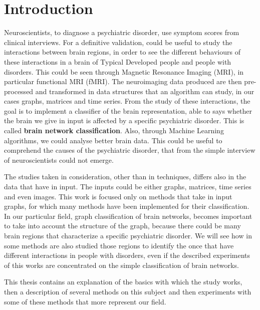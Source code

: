 \chapter{Introduction}
\label{chap:1}

Neuroscientists, to diagnose a psychiatric disorder, use symptom scores from clinical interviews. For a definitive validation, could be useful to study the interactions between brain regions, in order to see the different behaviours of these interactions in a brain of Typical Developed people and people with disorders. This could be seen through Magnetic Resonance Imaging (MRI), in particular functional MRI (fMRI). The neuroimaging data produced are then pre-processed and transformed in data structures that an algorithm can study, in our cases graphs, matrices and time series. From the study of these interactions, the goal is to implement a classifier of the brain representation, able to says whether the brain we give in input is affected by a specific psychiatric disorder. This is called \textbf{brain network classification}. Also, through Machine Learning algorithms, we could analyse better brain data. This could be useful to comprehend the causes of the psychiatric disorder, that from the simple interview of neuroscientists could not emerge. 
\vspace{0.5cm}

The studies taken in consideration, other than in techniques, differs also in the data that have in input. The inputs could be either graphs, matrices, time series and even images. This work is focused only on methods that take in input graphs, for which many methods have been implemented for their classification. In our particular field, graph classification of brain networks, becomes important to take into account the structure of the graph, because there could be many brain regions that characterize a specific psychiatric disorder. We will see how in some methods are also studied those regions to identify the once that have different interactions in people with disorders, even if the described experiments of this works are concentrated on the simple classification of brain networks. 
\vspace{0.5cm}

This thesis contains an explanation of the basics with which the study works, then a description of several methods on this subject and then experiments with some of these methods that more represent our field. 
\vspace{0.5cm}

